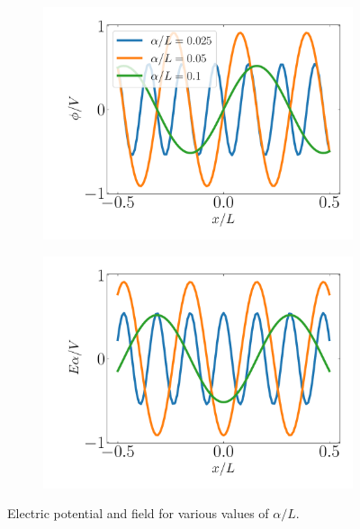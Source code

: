 \documentclass[a4paper,11pt]{report}
\begin{document}
\begin{figure}
    \centering
    \begin{subfigure}[b]{0.45\textwidth}
        \centering
        \includegraphics[width=\textwidth]{../../images/pf_phi.pdf}
        \caption{}
        \label{fig:pf_phi}
    \end{subfigure}
    \begin{subfigure}[b]{0.45\textwidth}
        \centering
        \includegraphics[width=\textwidth]{../../images/pf_elec.pdf}
        \caption{}
        \label{fig:pf_elec}
    \end{subfigure}
    \caption{Electric potential and field for various values of $\alpha/L$.}
    \label{fig:pf_phi_elec}
\end{figure}
\end{document}
